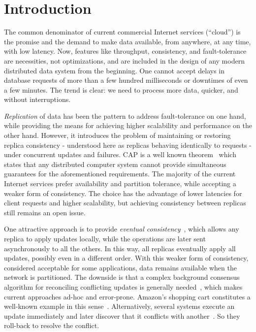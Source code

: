 \section{Introduction}
\label{sec:introduction}

The common denominator of current commercial Internet services (``cloud'') is the
promise and the demand to make data available, from anywhere, at any time, with
low latency. Now, features like throughput, consistency, and fault-tolerance are
necessities, not optimizations, and are included in the design of any modern
distributed data system from the beginning. One cannot accept delays in database
requests of more than a few hundred milliseconds or downtimes of even a few
minutes. The trend is clear: we need to process more data, quicker, and without
interruptions.

\textit{Replication} of data has been the pattern to address fault-tolerance on
one hand, while providing the means for achieving higher scalability and
performance on the other hand. However, it introduces the problem of maintaining
or restoring replica consistency - understood here as replicas behaving
identically to requests - under concurrent updates and failures. CAP is a well
known theorem~\cite{Gilbert:2002:BCF:564585.564601} which states that any
distributed computer system cannot provide simultaneous guarantees for the
aforementioned requirements. The majority of the current Internet services
prefer availability and partition tolerance, while accepting a weaker form of
consistency. The choice has the advantage of lower latencies for client requests
and higher scalability, but achieving consistency between replicas still remains
an open issue.

One attractive approach is to provide \textit{eventual
consistency}~\cite{DBLP:journals/queue/Vogels08a,Saito:2005:OR:1057977.1057980},
which allows any replica to apply updates locally, while the operations are
later sent asynchronously to all the others. In this way, all replicas
eventually apply all updates, possibly even in a different order. With this
weaker form of consistency, considered acceptable for some applications, data
remains available when the network is partitioned. The downside is that a
complex background consensus algorithm for reconciling conflicting updates is
generally needed~\cite{Terry:1995:MUC:224056.224070}, which makes current
approaches ad-hoc and error-prone. Amazon's shopping cart constitutes a
well-known example in this sense~\cite{DeCandia:2007:DAH:1294261.1294281}.
Alternatively, several systems execute an update immediately and later discover
that it conflicts with another~\cite{Terry:1995:MUC:224056.224070}. So they
roll-back to resolve the conflict.

